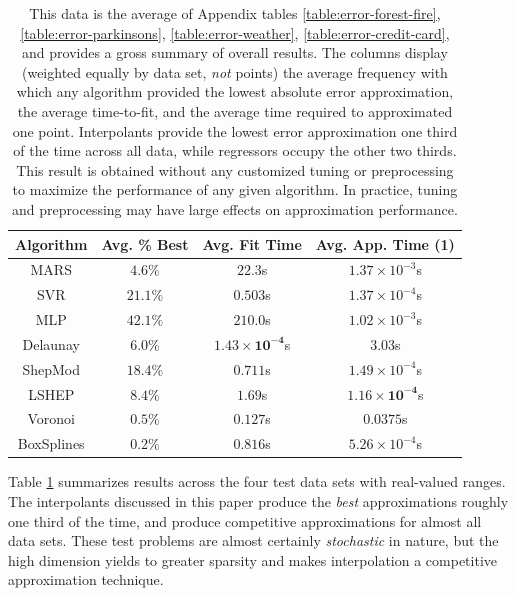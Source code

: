 \documentclass[smallextended,final]{svjour3}       %
\begin{document}
                                                                      
\begin{table}
  \centering
  \begin{tabular}{c|c|c|c}
    \hline
    Algorithm & Avg. \% Best & Avg. Fit Time & Avg. App. Time (1)\\
    \hline
    MARS & $4.6\%$ & $22.3$s & $1.37 \times 10^{-3}$s\\
    SVR & $\mathit{21.1}\%$ & $0.503$s & $\mathit{1.37 \times 10^{-4}}$s\\
    MLP & $\mathbf{42.1}\%$ & $210.0$s & $1.02 \times 10^{-3}$s\\
    Delaunay & $6.0\%$ & $\mathbf{1.43 \times 10^{-4}}$s & $3.03$s\\
    ShepMod & $18.4\%$ & $0.711$s & $1.49 \times 10^{-4}$s\\
    LSHEP & $8.4\%$ & $1.69$s & $\mathbf{1.16 \times 10^{-4}}$s\\
    Voronoi & $0.5\%$ & $\mathit{0.127}$s & $0.0375$s\\
    BoxSplines & $0.2\%$ & $0.816$s & $5.26 \times 10^{-4}$s\\
    \hline
  \end{tabular}
  \caption{This data is the average of Appendix tables
    \ref{table:error-forest-fire}, \ref{table:error-parkinsons},
    \ref{table:error-weather}, \ref{table:error-credit-card}, and
    provides a gross summary of overall results. The columns display
    (weighted equally by data set, \textit{not} points) the average
    frequency with which any algorithm provided the lowest absolute
    error approximation, the average time-to-fit, and the average time
    required to approximated one point. Interpolants provide the
    lowest error approximation one third of the time across all data,
    while regressors occupy the other two thirds. This result is
    obtained without any customized tuning or preprocessing to
    maximize the performance of any given algorithm. In practice,
    tuning and preprocessing may have large effects on approximation
    performance.}
  \label{table:avg-performance}
\end{table}

Table \ref{table:avg-performance} summarizes results across the four
test data sets with real-valued ranges. The interpolants discussed in
this paper produce the \textit{best} approximations roughly one third
of the time, and produce competitive approximations for almost all
data sets. These test problems are almost certainly
\textit{stochastic} in nature, but the high dimension yields to
greater sparsity and makes interpolation a competitive approximation
technique.
\end{document}
